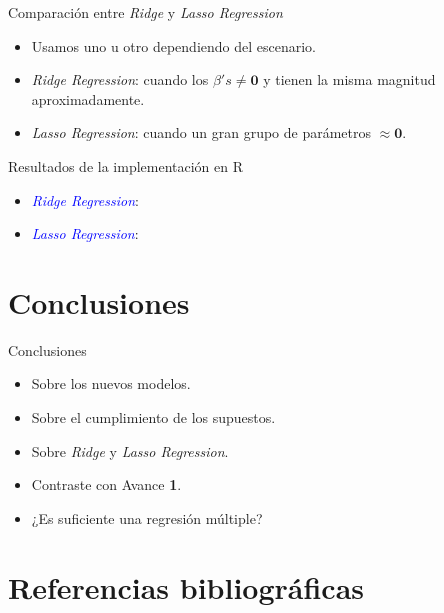 \documentclass[11pt]{beamer}
\newcommand{\B}{\beta}
\begin{document}
\begin{frame}{Comparación entre \textit{Ridge} y \textit{Lasso Regression}}
	\begin{itemize}
		\item Usamos uno u otro dependiendo del escenario.
		\pause
		\item \textit{Ridge Regression}: cuando los $\B's \not = \mathbf{0}$ y tienen la misma magnitud aproximadamente.
		\pause
		\item \textit{Lasso Regression}: cuando un gran grupo de parámetros $\approx \mathbf{0}$.
	\end{itemize}
\end{frame}

\begin{frame}{Resultados de la implementación en R}
	\begin{itemize}
		\item \textcolor{blue}{\textit{Ridge Regression}}:
		\pause
		\item \textcolor{blue}{\textit{Lasso Regression}}:
	\end{itemize}
\end{frame}

\section{Conclusiones}

\begin{frame}{Conclusiones}
	\begin{itemize}
		\item Sobre los nuevos modelos.
		\pause
		\item Sobre el cumplimiento de los supuestos.
		\pause
		\item Sobre \textit{Ridge} y \textit{Lasso Regression}.
		\pause
		\item Contraste con Avance \textbf{1}.
		\pause
		\item ¿Es suficiente una regresión múltiple?
	\end{itemize}
\end{frame}


\section{Referencias bibliográficas}
\end{document}
